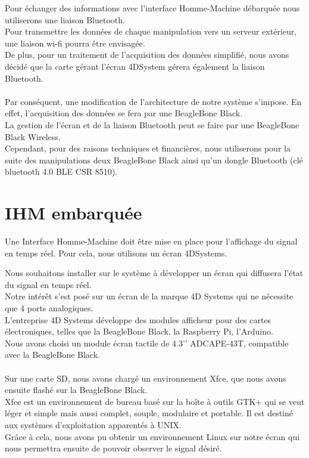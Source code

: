 \documentclass{report}
\begin{document}
Pour \'{e}changer des informations avec l’interface Homme-Machine d\'{e}barqu\'{e}e nous
utiliserons une liaison Bluetooth.\\
Pour transmettre les donn\'{e}es de chaque manipulation vers un serveur ext\'{e}rieur, une liaison
wi-fi pourra \^{e}tre envisag\'{e}e.\\
De plus, pour un traitement de l’acquisition des donn\'{e}es simplifi\'{e}, nous avons d\'{e}cid\'{e} que la
carte g\'{e}rant l’\'{e}cran 4DSystem g\'{e}rera \'{e}galement la liaison Bluetooth.\\ \\

Par cons\'{e}quent, une modification de l’architecture de notre syst\`{e}me s’impose.
En effet, l’acquisition des donn\'{e}es se fera par une BeagleBone Black.\\
La gestion de l’\'{e}cran et de la liaison Bluetooth peut se faire par une BeagleBone Black
Wireless.\\
Cependant, pour des raisons techniques et financi\`{e}res, nous utiliserons pour la suite des
manipulations deux BeagleBone Black ainsi qu’un dongle Bluetooth (cl\'{e} bluetooth 4.0 BLE
CSR 8510).\\


\section{IHM embarqu\'{e}e}

Une Interface Homme-Machine doit \^{e}tre mise en place pour l’affichage du signal en temps
r\'{e}el. Pour cela, nous utilisons un \'{e}cran 4DSystems.



Nous souhaitons installer sur le syst\`{e}me \`{a} d\'{e}velopper un \'{e}cran qui diffusera l’\'{e}tat du signal
en temps r\'{e}el.\\
Notre int\'{e}r\^{e}t s’est pos\'{e} sur un \'{e}cran de la marque 4D Systems qui ne n\'{e}cessite que 4 ports
analogiques.\\
L’entreprise 4D Systems d\'{e}veloppe des modules afficheur pour des cartes \'{e}lectroniques,
telles que la BeagleBone Black, la Raspberry Pi, l’Arduino.\\
Nous avons choisi un module \'{e}cran tactile de 4.3’’ ADCAPE-43T, compatible avec la
BeagleBone Black.\\ \\

Sur une carte SD, nous avons charg\'{e} un environnement Xfce, que nous avons ensuite flash\'{e}
sur la BeagleBone Black.\\
Xfce est un environnement de bureau bas\'{e} sur la boîte \`{a} outils GTK+ qui se veut l\'{e}ger et
simple mais aussi complet, souple, modulaire et portable. Il est destin\'{e} aux syst\`{e}mes
d'exploitation apparent\'{e}s \`{a} UNIX.\\
Gr\^{a}ce \`{a} cela, nous avons pu obtenir un environnement Linux sur notre \'{e}cran qui nous
permettra ensuite de pouvoir observer le signal d\'{e}sir\'{e}.
\end{document}
